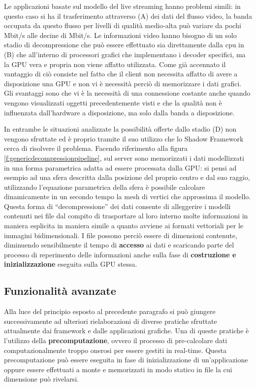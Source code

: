 Le applicazioni basate sul modello del live streaming hanno problemi simili: in questo caso si ha il trasferimento attraverso (A) dei dati del flusso video, la banda occupata da questo flusso per livelli di qualit\`a medio-alta pu\`o variare da pochi Mbit/s alle decine di Mbit/s. Le informazioni video hanno bisogno di un solo stadio di decompressione che pu\`o essere effettuato sia direttamente dalla cpu in (B) che all'interno di processori grafici che implementano i decoder specifici, ma la \ac{GPU} vera e propria non viene affatto utilizzata. Come gi\`a accennato il vantaggio di ci\`o consiste nel fatto che il client non necessita affatto di avere a disposizione una \ac{GPU} e non vi \`e necessit\`a perci\`o di memorizzare i dati grafici. Gli svantaggi sono che vi \`e la necessit\`a di una connessione costante anche quando vengono visualizzati oggetti precedentemente visti e che la qualit\`a non \`e influenzata dall'hardware a disposizione, ma solo dalla banda a disposizione.

In entrambe le situazioni analizzate la possibilit\`a offerte dallo stadio (D) non vengono sfruttate ed \`e proprio tramite il suo utilizzo che lo Shadow Framework cerca di risolvere il problema. Facendo riferimento alla figura \ref{f:genericdecompressionpipeline}, sul server sono memorizzati i dati modellizzati in una forma parametrica adatta ad essere processata dalla \ac{GPU}: si pensi ad esempio ad una sfera descritta dalla posizione del proprio centro e dal suo raggio, utilizzando l'equazione parametrica della sfera \`e possibile calcolare dinamicamente in un secondo tempo la mesh di vertici che approssima il modello. Questa forma di ``decompressione'' dei dati consente di alleggerire i modelli contenuti nei file dal compito di trasportare al loro interno molte informazioni in maniera esplicita in maniera simile a quanto avviene ai formati vettoriali per le immagini bidimensionali. I file possono perci\`o essere di dimensioni contenute, diminuendo sensibilmente il tempo di \textbf{accesso} ai dati e scaricando parte del processo di reperimento delle informazioni anche sulla fase di \textbf{costruzione e inizializzazione} eseguita sulla \ac{GPU} stessa.

\subsection{Funzionalit\`a avanzate}
Alla luce del principio esposto al precedente paragrafo si pu\`o giungere successivamente ad ulteriori rielaborazioni di diverse pratiche sfruttate attualmente dai framework e dalle applicazioni grafiche. Una di queste pratiche \`e l'utilizzo della \textbf{precomputazione}, ovvero il processo di pre-calcolare dati computazionalmente troppo onerosi per essere gestiti in real-time. Questa precomputazione pu\`o essere eseguita in fase di inizializzazione di un'applicazione oppure essere effettuati a monte e memorizzati in modo statico in file la cui dimensione pu\`o rivelarsi. 

